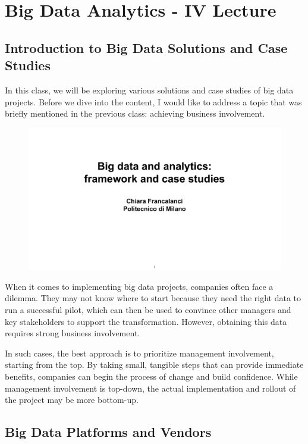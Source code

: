 \section{Big Data Analytics - IV Lecture}

\subsection{Introduction to Big Data Solutions and Case Studies}

In this class, we will be exploring various solutions and case studies
of big data projects. Before we dive into the content, I would like to
address a topic that was briefly mentioned in the previous class:
achieving business involvement.

\begin{figure}[!h]
  \centering
  \includegraphics[page=56, trim = 1.5cm 1cm 1.5cm 1.5cm, clip, width=\imagewidth]{images/06 - BIG_DATA.pdf}
\end{figure}

When it comes to implementing big data projects, companies often face a
dilemma. They may not know where to start because they need the right
data to run a successful pilot, which can then be used to convince other
managers and key stakeholders to support the transformation. However,
obtaining this data requires strong business involvement.

In such cases, the best approach is to prioritize management
involvement, starting from the top. By taking small, tangible steps that
can provide immediate benefits, companies can begin the process of
change and build confidence. While management involvement is top-down,
the actual implementation and rollout of the project may be more
bottom-up.

\subsection{Big Data Platforms and Vendors}

